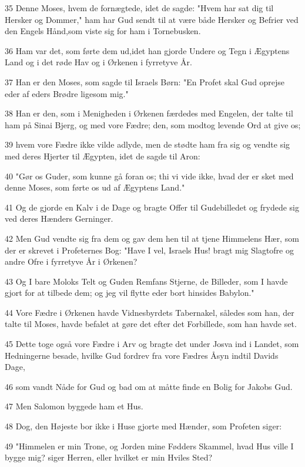 \par 35 Denne Moses, hvem de fornægtede, idet de sagde: "Hvem har sat dig til Hersker og Dommer," ham har Gud sendt til at være både Hersker og Befrier ved den Engels Hånd,som viste sig for ham i Tornebusken.
\par 36 Ham var det, som førte dem ud,idet han gjorde Undere og Tegn i Ægyptens Land og i det røde Hav og i Ørkenen i fyrretyve År.
\par 37 Han er den Moses, som sagde til Israels Børn: "En Profet skal Gud oprejse eder af eders Brødre ligesom mig."
\par 38 Han er den, som i Menigheden i Ørkenen færdedes med Engelen, der talte til ham på Sinai Bjerg, og med vore Fædre; den, som modtog levende Ord at give os;
\par 39 hvem vore Fædre ikke vilde adlyde, men de stødte ham fra sig og vendte sig med deres Hjerter til Ægypten, idet de sagde til Aron:
\par 40 "Gør os Guder, som kunne gå foran os; thi vi vide ikke, hvad der er sket med denne Moses, som førte os ud af Ægyptens Land."
\par 41 Og de gjorde en Kalv i de Dage og bragte Offer til Gudebilledet og frydede sig ved deres Hænders Gerninger.
\par 42 Men Gud vendte sig fra dem og gav dem hen til at tjene Himmelens Hær, som der er skrevet i Profeternes Bog: "Have I vel, Israels Hus! bragt mig Slagtofre og andre Ofre i fyrretyve År i Ørkenen?
\par 43 Og I bare Moloks Telt og Guden Remfans Stjerne, de Billeder, som I havde gjort for at tilbede dem; og jeg vil flytte eder bort hinsides Babylon."
\par 44 Vore Fædre i Ørkenen havde Vidnesbyrdets Tabernakel, således som han, der talte til Moses, havde befalet at gøre det efter det Forbillede, som han havde set.
\par 45 Dette toge også vore Fædre i Arv og bragte det under Josva ind i Landet, som Hedningerne besade, hvilke Gud fordrev fra vore Fædres Åsyn indtil Davids Dage,
\par 46 som vandt Nåde for Gud og bad om at måtte finde en Bolig for Jakobs Gud.
\par 47 Men Salomon byggede ham et Hus.
\par 48 Dog, den Højeste bor ikke i Huse gjorte med Hænder, som Profeten siger:
\par 49 "Himmelen er min Trone, og Jorden mine Fødders Skammel, hvad Hus ville I bygge mig? siger Herren, eller hvilket er min Hviles Sted?

